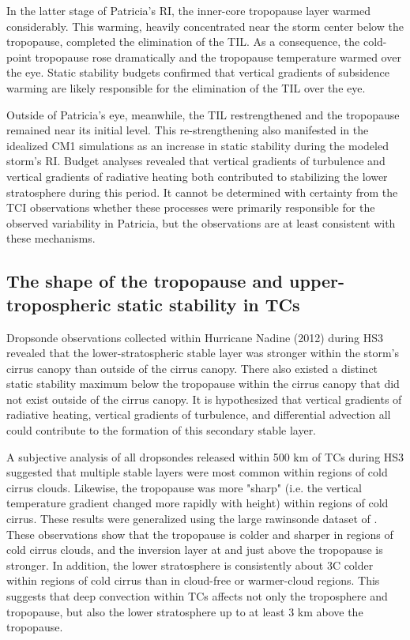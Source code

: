 In the latter stage of Patricia's RI, the inner-core tropopause layer warmed considerably.
This warming, heavily concentrated near the storm center below the tropopause, completed the elimination of the TIL.
As a consequence, the cold-point tropopause rose dramatically and the tropopause temperature warmed over the eye.
Static stability budgets confirmed that vertical gradients of subsidence warming are likely responsible for the elimination of the TIL over the eye.

Outside of Patricia's eye, meanwhile, the TIL restrengthened and the tropopause remained near its initial level.
This re-strengthening also manifested in the idealized CM1 simulations as an increase in static stability during the modeled storm's RI.
Budget analyses revealed that vertical gradients of turbulence and vertical gradients of radiative heating both contributed to stabilizing the lower stratosphere during this period.
It cannot be determined with certainty from the TCI observations whether these processes were primarily responsible for the observed variability in Patricia, but the observations are at least consistent with these mechanisms.

\subsection{The shape of the tropopause and upper-tropospheric static stability in TCs}

Dropsonde observations collected within Hurricane Nadine (2012) during HS3 revealed that the lower-stratospheric stable layer was stronger within the storm's cirrus canopy than outside of the cirrus canopy.
There also existed a distinct static stability maximum below the tropopause within the cirrus canopy that did not exist outside of the cirrus canopy.
It is hypothesized that vertical gradients of radiative heating, vertical gradients of turbulence, and differential advection all could contribute to the formation of this secondary stable layer.

A subjective analysis of all dropsondes released within 500 km of TCs during HS3 suggested that multiple stable layers were most common within regions of cold cirrus clouds.
Likewise, the tropopause was more "sharp" (i.e. the vertical temperature gradient changed more rapidly with height) within regions of cold cirrus.
These results were generalized using the large rawinsonde dataset of \cite{DuranMolinari2016}.
These observations show that the tropopause is colder and sharper in regions of cold cirrus clouds, and the inversion layer at and just above the tropopause is stronger.
In addition, the lower stratosphere is consistently about 3\textdegree{}C colder within regions of cold cirrus than in cloud-free or warmer-cloud regions.
This suggests that deep convection within TCs affects not only the troposphere and tropopause, but also the lower stratosphere up to at least 3 km above the tropopause.

